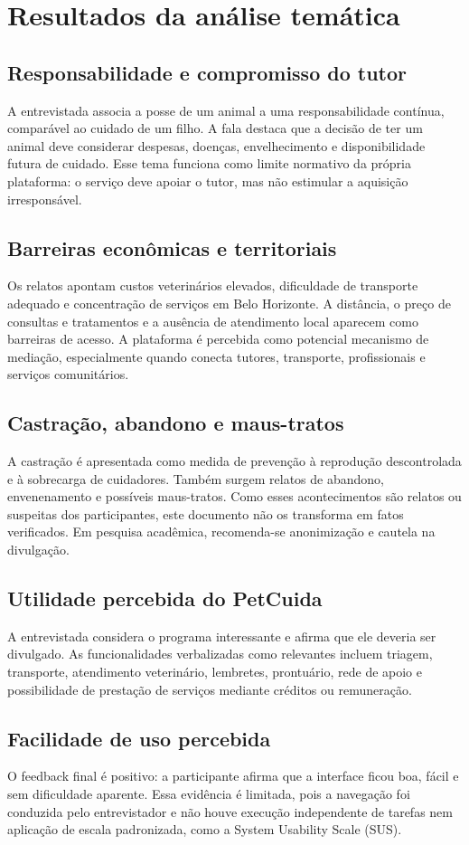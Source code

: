 \documentclass[12pt,a4paper]{article}
\begin{document}
\section{Resultados da análise temática}
\subsection{Responsabilidade e compromisso do tutor}
A entrevistada associa a posse de um animal a uma responsabilidade contínua, comparável ao cuidado de um filho. A fala destaca que a decisão de ter um animal deve considerar despesas, doenças, envelhecimento e disponibilidade futura de cuidado. Esse tema funciona como limite normativo da própria plataforma: o serviço deve apoiar o tutor, mas não estimular a aquisição irresponsável.
\subsection{Barreiras econômicas e territoriais}
Os relatos apontam custos veterinários elevados, dificuldade de transporte adequado e concentração de serviços em Belo Horizonte. A distância, o preço de consultas e tratamentos e a ausência de atendimento local aparecem como barreiras de acesso. A plataforma é percebida como potencial mecanismo de mediação, especialmente quando conecta tutores, transporte, profissionais e serviços comunitários.
\subsection{Castração, abandono e maus-tratos}
A castração é apresentada como medida de prevenção à reprodução descontrolada e à sobrecarga de cuidadores. Também surgem relatos de abandono, envenenamento e possíveis maus-tratos. Como esses acontecimentos são relatos ou suspeitas dos participantes, este documento não os transforma em fatos verificados. Em pesquisa acadêmica, recomenda-se anonimização e cautela na divulgação.
\subsection{Utilidade percebida do PetCuida}
A entrevistada considera o programa interessante e afirma que ele deveria ser divulgado. As funcionalidades verbalizadas como relevantes incluem triagem, transporte, atendimento veterinário, lembretes, prontuário, rede de apoio e possibilidade de prestação de serviços mediante créditos ou remuneração.
\subsection{Facilidade de uso percebida}
O feedback final é positivo: a participante afirma que a interface ficou boa, fácil e sem dificuldade aparente. Essa evidência é limitada, pois a navegação foi conduzida pelo entrevistador e não houve execução independente de tarefas nem aplicação de escala padronizada, como a System Usability Scale (SUS).
\end{document}
